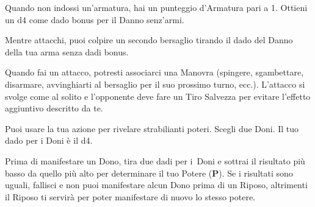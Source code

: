 \documentclass[itdr]{subfiles}
\begin{document}
\vfill
{}\featmt\feathp
Quando non indossi un'armatura, hai un punteggio d’Armatura pari a 1. Ottieni un d4 come dado bonus per il Danno senz’armi.

\clearpage

\vfill
{}\feathp
Mentre attacchi, puoi colpire un secondo bersaglio tirando il dado del Danno della tua arma senza dadi bonus.

\vfill
{}
\feathp
Quando fai un attacco, potresti associarci una Manovra (spingere, sgambettare, disarmare, avvinghiarti al bersaglio per il suo prossimo turno, ecc.). L’attacco si svolge come al solito e l’opponente deve fare un Tiro Salvezza per evitare l’effetto aggiuntivo descritto da te.

\vfill
{}
\featmt
Puoi usare la tua azione per rivelare strabilianti poteri. Scegli due Doni. Il tuo dado per i Doni è il d4.

Prima di manifestare un Dono, tira due dadi per i~Doni e sottrai il risultato più basso da quello più alto per determinare il tuo Potere (\textbf{P}). Se i risultati sono uguali, fallisci e non puoi manifestare alcun Dono prima di un Riposo, altrimenti il Riposo ti servirà per poter manifestare di nuovo lo stesso potere.
\end{document}
